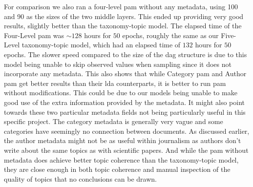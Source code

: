 For comparison we also ran a four-level \gls{pam} without any metadata, using 100 and 90 as the sizes of the two middle layers.
This ended up providing very good results, slightly better than the taxonomy-topic model.
The elapsed time of the Four-Level \gls{pam} was ${\sim}128$ hours for $50$ epochs, roughly the same as our Five-Level taxonomy-topic model, which had an elapsed time of $132$ hours for $50$ epochs.
The slower speed compared to the size of the \gls{dag} structure is due to this model being unable to skip observed values when sampling since it does not incorporate any metadata.
This also shows that while Category \gls{pam} and Author \gls{pam} get better results than their \gls{lda} counterparts, it is better to run \gls{pam} without modifications.
This could be due to our models being unable to make good use of the extra information provided by the metadata.
It might also point towards these two particular metadata fields not being particularly useful in this specific project.
The category metadata is generally very vague and some categories have seemingly no connection between documents.
As discussed earlier, the author metadata might not be as useful within journalism as authors don't write about the same topics as with scientific papers.
And while the \gls{pam} without metadata does achieve better topic coherence than the taxonomy-topic model, they are close enough in both topic coherence and manual inspection of the quality of topics that no conclusions can be drawn.
